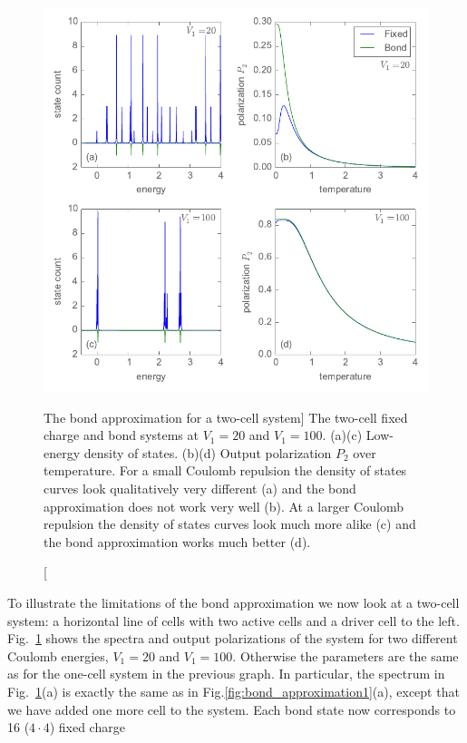 %
\begin{figure}
  \center
  \includegraphics{bond_approximation2}
  \caption
  [The bond approximation for a two-cell system]
  {
  The two-cell fixed charge and bond systems at $V_1 = 20$ and $V_1 = 100$.
  (a)(c) Low-energy density of states. (b)(d) Output polarization $P_2$ over
  temperature. For a small Coulomb repulsion the density of states curves look
  qualitatively very different (a) and the bond approximation does not work very
  well (b). At a larger Coulomb repulsion the density of states curves look much
  more alike (c) and the bond approximation works much better (d).
  }
  \label{fig:bond_approximation2}
\end{figure}
%
To illustrate the limitations of the bond approximation we now look at a
two-cell system: a horizontal line of cells with two active cells and a driver
cell to the left. Fig.~\ref{fig:bond_approximation2} shows the spectra and
output polarizations of the system for two different Coulomb energies, $V_1 =
20$ and $V_1 = 100$. Otherwise the parameters are the same as for the one-cell
system in the previous graph. In particular, the spectrum in
Fig.~\ref{fig:bond_approximation2}(a) is exactly the same as in
Fig.\ref{fig:bond_approximation1}(a), except that we have added one more cell to
the system. Each bond state now corresponds to 16 ($4 \cdot 4$) fixed charge
